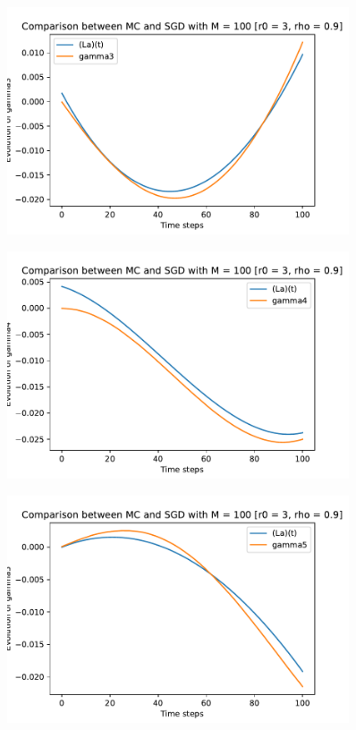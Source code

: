 \documentclass[a4paper,11pt,openright]{report}
\begin{document}
\begin{figure}[H]
\centering
\includegraphics[width=0.9\textwidth]{gamma3 SGD 100.pdf}
\end{figure}
\begin{figure}[H]
\centering
\includegraphics[width=0.9\textwidth]{gamma4 SGD 100.pdf}
\end{figure}
\begin{figure}[H]
\centering
\includegraphics[width=0.9\textwidth]{gamma5 SGD 100.pdf}
\end{figure}
\end{document}
